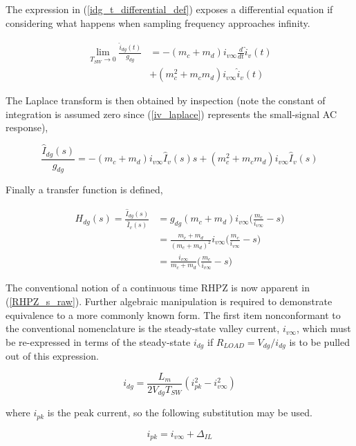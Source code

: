\documentclass[conference]{IEEEtran}
\begin{document}
The expression in (\ref{idg_t_differential_def}) exposes a differential equation if considering what happens when sampling frequency approaches infinity.
	
\begin{align}
\lim_{T_{SW} \to 0} \frac{\hat{i}_{dg}(t)}{g_{dg}} & = -(m_c + m_d) i_{v\infty} \frac{d }{dt} \hat{i}_v(t) \nonumber \\
& + 	( m_c^2 + m_c m_d ) i_{v\infty} \hat{i}_v(t) 
\end{align}

The Laplace transform is then obtained by inspection (note the constant of integration is assumed zero since (\ref{iv_laplace}) represents the small-signal AC response),

\begin{equation}
	 \frac{\hat{I}_{dg}(s)}{g_{dg}} =  - (m_c + m_d) i_{v\infty}\hat{I}_{v}(s)s + ( m_c^2 + m_c m_d ) i_{v\infty} \hat{I}_{v}(s)
     \label{iv_laplace}
\end{equation}

Finally a transfer function is defined,

\begin{align}
H_{dg} (s) = \frac{\hat{I}_{dg}(s)}{\hat{I}_{v}(s)} &=  g_{dg} (m_c + m_d) i_{v\infty}
\big (\frac{m_c}{i_{v\infty}} - s \big )  \nonumber\\
&= \frac{m_c + m_d}{(m_c + m_d)^2} i_{v\infty}
\big (\frac{m_c}{i_{v\infty}} - s \big ) \nonumber \\
&= \frac{i_{v\infty}}{m_c + m_d}
\big (\frac{m_c}{i_{v\infty}} - s \big )
\label{RHPZ_s_raw}
\end{align}

The conventional notion of a continuous time RHPZ is now apparent in (\ref{RHPZ_s_raw}).  
Further algebraic manipulation is required to demonstrate equivalence to a more commonly known form.  The first item nonconformant to the conventional nomenclature is the steady-state valley current, $i_{v\infty}$, which must be re-expressed in terms of the steady-state $i_{dg}$ if $R_{LOAD} = V_{dg}/i_{dg}$ is to be pulled out of this expression.

\begin{equation}
	i_{dg} = \frac{L_m}{2V_{dg}T_{SW}} (i_{pk}^2 - i_{v\infty}^2)
	\label{steady_state_idg}
\end{equation}

where $i_{pk}$ is the peak current, so the following substitution may be used.

\begin{equation}
i_{pk} = i_{v\infty} + \Delta_{IL}
\label{ipk_ripple}
\end{equation}
\end{document}
